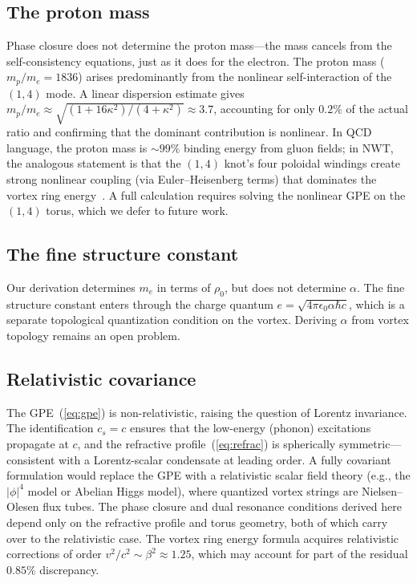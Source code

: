 \documentclass[11pt,a4paper]{article}
\begin{document}
\subsection{The proton mass}

Phase closure does not determine the proton mass---the mass cancels
from the self-consistency equations, just as it does for the electron.
The proton mass ($m_p/m_e = 1836$) arises predominantly from the
nonlinear self-interaction of the $(1,4)$ mode.  A linear dispersion
estimate gives
$m_p/m_e \approx \sqrt{(1+16\kappa^2)/(4+\kappa^2)} \approx 3.7$,
accounting for only $0.2\%$ of the actual ratio and confirming that
the dominant contribution is nonlinear.  In QCD language, the proton
mass is $\sim 99\%$ binding energy from gluon fields;
in NWT, the analogous statement is that the $(1,4)$ knot's four
poloidal windings create strong nonlinear coupling (via
Euler--Heisenberg terms) that dominates the vortex ring
energy~\cite{paper4}.  A full calculation requires solving the
nonlinear GPE on the $(1,4)$ torus, which we defer to future work.

\subsection{The fine structure constant}

Our derivation determines $m_e$ in terms of $\rho_0$, but does
not determine $\alpha$.  The fine structure constant enters through
the charge quantum $e = \sqrt{4\pi\epsilon_0\alpha\hbar c}$, which
is a separate topological quantization condition on the vortex.
Deriving $\alpha$ from vortex topology remains an open problem.

\subsection{Relativistic covariance}

The GPE~(\ref{eq:gpe}) is non-relativistic, raising the question of
Lorentz invariance.  The identification $c_s = c$ ensures that the
low-energy (phonon) excitations propagate at $c$, and the refractive
profile~(\ref{eq:refrac}) is spherically symmetric---consistent with
a Lorentz-scalar condensate at leading order.  A fully covariant
formulation would replace the GPE with a relativistic scalar field
theory (e.g., the $|\phi|^4$ model or Abelian Higgs model), where
quantized vortex strings are Nielsen--Olesen flux tubes.  The
phase closure and dual resonance conditions derived here depend only
on the refractive profile and torus geometry, both of which carry
over to the relativistic case.  The vortex ring energy formula
acquires relativistic corrections of order $v^2/c^2 \sim \beta^2
\approx 1.25$, which may account for part of the residual $0.85\%$
discrepancy.
\end{document}
